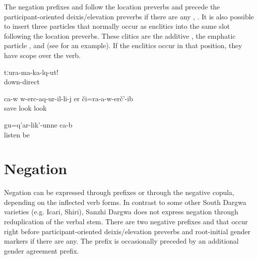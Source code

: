 The negation prefixes  and  follow the location preverbs and precede the participant-oriented deixis/elevation preverbs if there are any , . It is also possible to insert three particles that normally occur as enclitics into the same slot following the location preverbs. These clitics are the additive  , the emphatic particle  , and  (see  for an example). If the enclitics occur in that position, they have scope over the verb.
%
\begin{exe}
	\ex	\label{ex:Do not go out (of the car) (said to a man) verbs}
	\gll	tːura-ma-ka-lq-ut!\\
		down-direct\\
	\glt	{}

	\ex	\label{ex:He did not even look at his savior verbs}
	\gll	ca-w	w-erc-aq-ur-il-li-j	er či=ra-a-w-erč'-ib\\
			save	look look\\
	\glt	{}

	\ex	\label{ex:As for listening, s/he is listening verbs}
	\gll	gu=q'ar-lik'-unne	ca-b\\
		listen	be\\
	\glt	{}
\end{exe}



\section{Negation}
\label{sec:Negation}

Negation can be expressed through prefixes or through the negative copula, depending on the inflected verb forms. In contrast to some other South Dargwa varieties (e.g. Icari, Shiri), Sanzhi Dargwa does not express negation through reduplication of the verbal stem. There are two negative prefixes  and  that occur right before participant-oriented deixis/elevation preverbs and root-initial gender markers if there are any. The prefix  is occasionally preceded by an additional gender agreement prefix.


